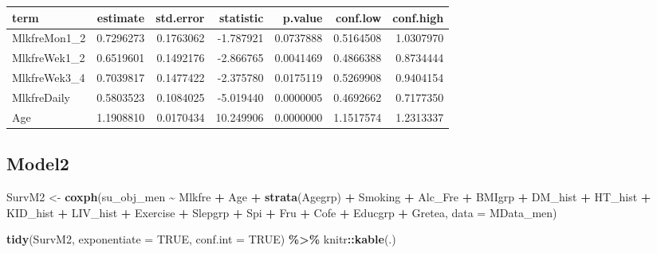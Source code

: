 \documentclass[
]{article}
\newenvironment{Shaded}{\begin{snugshade}}{\end{snugshade}}
\newcommand{\DataTypeTok}[1]{\textcolor[rgb]{0.13,0.29,0.53}{#1}}
\newcommand{\KeywordTok}[1]{\textcolor[rgb]{0.13,0.29,0.53}{\textbf{#1}}}
\newcommand{\NormalTok}[1]{#1}
\newcommand{\OperatorTok}[1]{\textcolor[rgb]{0.81,0.36,0.00}{\textbf{#1}}}
\newcommand{\OtherTok}[1]{\textcolor[rgb]{0.56,0.35,0.01}{#1}}
\newcommand{\StringTok}[1]{\textcolor[rgb]{0.31,0.60,0.02}{#1}}
\begin{document}
\begin{longtable}[]{@{}lrrrrrr@{}}
\toprule
term & estimate & std.error & statistic & p.value & conf.low &
conf.high\tabularnewline
\midrule
\endhead
MlkfreMon1\_2 & 0.7296273 & 0.1763062 & -1.787921 & 0.0737888 &
0.5164508 & 1.0307970\tabularnewline
MlkfreWek1\_2 & 0.6519601 & 0.1492176 & -2.866765 & 0.0041469 &
0.4866388 & 0.8734444\tabularnewline
MlkfreWek3\_4 & 0.7039817 & 0.1477422 & -2.375780 & 0.0175119 &
0.5269908 & 0.9404154\tabularnewline
MlkfreDaily & 0.5803523 & 0.1084025 & -5.019440 & 0.0000005 & 0.4692662
& 0.7177350\tabularnewline
Age & 1.1908810 & 0.0170434 & 10.249906 & 0.0000000 & 1.1517574 &
1.2313337\tabularnewline
\bottomrule
\end{longtable}

\hypertarget{model2-5}{%
\subsection{Model2}\label{model2-5}}

\begin{Shaded}
\begin{Highlighting}[]
\NormalTok{SurvM2 \textless{}{-}}\StringTok{  }\KeywordTok{coxph}\NormalTok{(su\_obj\_men }\OperatorTok{\textasciitilde{}}\StringTok{ }\NormalTok{Mlkfre }\OperatorTok{+}\StringTok{ }\NormalTok{Age }\OperatorTok{+}\StringTok{ }\KeywordTok{strata}\NormalTok{(Agegrp) }\OperatorTok{+}\StringTok{ }\NormalTok{Smoking }\OperatorTok{+}\StringTok{ }\NormalTok{Alc\_Fre }\OperatorTok{+}\StringTok{ }
\StringTok{                   }\NormalTok{BMIgrp }\OperatorTok{+}\StringTok{ }\NormalTok{DM\_hist }\OperatorTok{+}\StringTok{ }\NormalTok{HT\_hist }\OperatorTok{+}\StringTok{ }\NormalTok{KID\_hist }\OperatorTok{+}\StringTok{ }\NormalTok{LIV\_hist }\OperatorTok{+}\StringTok{ }\NormalTok{Exercise }\OperatorTok{+}\StringTok{ }
\StringTok{                   }\NormalTok{Slepgrp }\OperatorTok{+}\StringTok{ }\NormalTok{Spi }\OperatorTok{+}\StringTok{ }\NormalTok{Fru }\OperatorTok{+}\StringTok{ }\NormalTok{Cofe }\OperatorTok{+}\StringTok{ }\NormalTok{Educgrp }\OperatorTok{+}\StringTok{ }\NormalTok{Gretea, }
                 \DataTypeTok{data =}\NormalTok{ MData\_men)}

\KeywordTok{tidy}\NormalTok{(SurvM2, }\DataTypeTok{exponentiate =} \OtherTok{TRUE}\NormalTok{, }\DataTypeTok{conf.int =} \OtherTok{TRUE}\NormalTok{) }\OperatorTok{\%\textgreater{}\%}\StringTok{ }
\StringTok{  }\NormalTok{knitr}\OperatorTok{::}\KeywordTok{kable}\NormalTok{(.)}
\end{Highlighting}
\end{Shaded}
\end{document}
